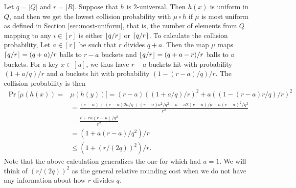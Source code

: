 Let $q=|Q|$ and $r=|R|$. Suppose that $h$ is $2$-universal. Then
$h(x)$ is uniform in $Q$, and then we get the lowest collision
probability with $\mu\circ h$ if $\mu$ is most uniform as defined in
Section \ref{sec:most-uniform}, that is, the number of elements from
$Q$ mapping to any $i\in[r]$ is either $\lfloor {q/r} \rfloor$ or
$\lceil {q/r}\rceil$. To calculate the collision probability,
Let $a\in[r]$ be such that $r$ divides $q+a$. Then the map $\mu$ maps
$\lceil {q/r}\rceil=(q+a)/r$ balls to $r-a$ buckets and
$\lfloor {q/r} \rfloor=(q+a-r)/r$ balls to $a$ buckets. For a key $x\in [u]$, we
thus have $r-a$ buckets hit with probability $(1+a/q)/r$ and
$a$ buckets hit with probability $(1-(r-a)/q)/r$.
The collision probability is then
\begin{equation}\begin{split}
    \Pr[\mu(h(x))=&\mu(h(y))]= (r-a)((1+a/q)/r)^2+a((1-(r-a)r/q)/r)^2
        \\&=\frac{(r-a)+(r-a)2a/q+(r-a)a^2/q^2+ a-a2(r-a)/p+a(r-a)^2/q^2}{r^2}
        \\&=\frac{r +r a (r-a)/q^2}{r^2}
        \\&=(1+a(r-a)/q^2)/r
        \\&\le \left(1+(r/(2q))^2\right)/r.\label{eq:coll-a}
\end{split}\end{equation}
Note that the above calculation generalizes the one for  which
had $a=1$. We will think of $(r/(2q))^2$ as the general relative rounding
cost when we do not have any information about how $r$ divides $q$.






